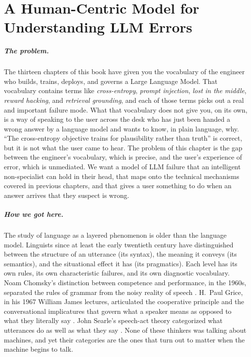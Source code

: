 \chapter{A Human-Centric Model for Understanding LLM Errors}
\label{chap:error-model}
\label{sec:ch13-error-model}

\scenelabel
\begin{scenestrip}
\end{scenestrip}

\paragraph{The problem.}
The thirteen chapters of this book have given you the vocabulary of
the engineer who builds, trains, deploys, and governs a Large
Language Model. That vocabulary contains terms like
\emph{cross-entropy}, \emph{prompt injection}, \emph{lost in the
middle}, \emph{reward hacking}, and \emph{retrieval grounding}, and
each of those terms picks out a real and important failure mode.
What that vocabulary does not give you, on its own, is a way of
speaking to the user across the desk who has just been handed a
wrong answer by a language model and wants to know, in plain
language, why. ``The cross-entropy objective trains for plausibility
rather than truth'' is correct, but it is not what the user came to
hear. The problem of this chapter is the gap between the engineer's
vocabulary, which is precise, and the user's experience of error,
which is unmediated. We want a model of LLM failure that an
intelligent non-specialist can hold in their head, that maps onto
the technical mechanisms covered in previous chapters, and that
gives a user something to do when an answer arrives that they
suspect is wrong.

\paragraph{How we got here.}
The study of language as a layered phenomenon is older than the
language model. Linguists since at least the early twentieth
century have distinguished between the structure of an utterance
(its syntax), the meaning it conveys (its semantics), and the
situational effect it has (its pragmatics). Each level has its own
rules, its own characteristic failures, and its own diagnostic
vocabulary. Noam Chomsky's distinction between competence and
performance, in the 1960s, separated the rules of grammar from the
noisy reality of speech \citep{chomsky1965aspects}. H.~Paul Grice,
in his 1967 William James lectures, articulated the cooperative
principle and the conversational implicatures that govern what a
speaker means as opposed to what they literally say
\citep{grice1975logic}. John Searle's speech-act theory categorized
what utterances do as well as what they say
\citep{searle1969speech}. None of these thinkers was talking about
machines, and yet their categories are the ones that turn out to
matter when the machine begins to talk.

